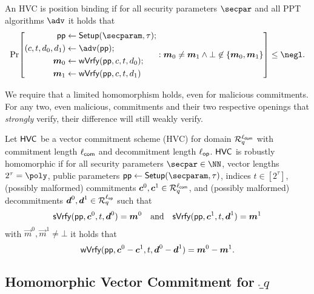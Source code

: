\begin{definition}
  An HVC is position binding if for all security parameters $\secpar$ and all PPT algorithms $\adv$ it holds that
  \[
    \Pr\mleft[
      \begin{aligned}
      \params\gets{}&\setup(\secparam,\tau);\\
      (c,t,d_0,d_1) \gets{}& \adv(\params);\\
      \vec{m}_0 \gets{}& \wverify(\params,c,t,d_0);\\
      \vec{m}_1 \gets{}& \wverify(\params,c,t,d_1)
      \end{aligned}:
      \vec{m}_0\neq \vec{m}_1 \land \bot\not\in\{\vec{m}_0,\vec{m}_1\}
    \mright]\leq \negl.
  \]
\end{definition}
We require that a limited homomorphism holds, even for malicious commitments.
For any two, even malicious, commitments and their two respective openings that \emph{strongly} verify, their difference will still weakly verify.

\begin{definition}
  \label{def:malhomhvc}
  Let $\mathsf{HVC}$ be a vector commitment scheme (HVC) for domain $\mathcal{R}^{\ell_{\mathsf{dom}}}_q$ with commitment length ${\ell_{\mathsf{com}}}$ and decommitment length ${\ell_{\mathsf{op}}}$.
  $\mathsf{HVC}$ is robustly homomorphic if for all security parameters $\secpar\in\NN$, vector lengths $2^\tau=\poly$, public parameters $\params\gets\setup(\secparam,\tau)$, indices $t\in[2^\tau]$, (possibly malformed) commitments $\boldsymbol{c}^0,\boldsymbol{c}^1 \in \mathcal{R}_q^{\ell_{\mathsf{com}}}$, and (possibly malformed) decommitments $\boldsymbol{d}^0,\boldsymbol{d}^1\in\mathcal{R}_q^{\ell_{\mathsf{op}}}$ such that
  \[
    \mathsf{sVrfy}(\mathsf{pp},\boldsymbol{c}^0, t,\boldsymbol{d}^0)=\boldsymbol{m}^0 \quad \text{and} \quad \mathsf{sVrfy}(\mathsf{pp},\boldsymbol{c}^1, t,\boldsymbol{d}^1)=\boldsymbol{m}^1
  \]
  with $\vec{m}^0,\vec{m}^1\neq \bot$ it holds that
  \[
    \mathsf{wVrfy}(\mathsf{pp},\boldsymbol{c}^0 - \boldsymbol{c}^1, t,\boldsymbol{d}^0 - \boldsymbol{d}^1)=\boldsymbol{m}^0 - \boldsymbol{m}^1.
  \]
\end{definition}


\subsection{Homomorphic Vector Commitment for $\ring_q$}


